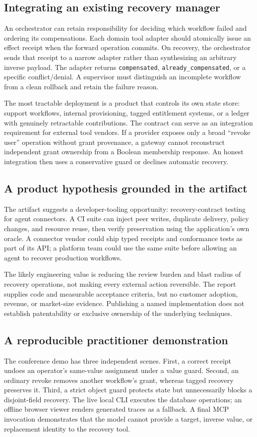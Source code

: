 \documentclass[10pt,twocolumn]{article}
\begin{document}
\subsection{Integrating an existing recovery manager}
An orchestrator can retain responsibility for deciding which workflow failed and ordering its compensations. Each domain tool adapter should atomically issue an effect receipt when the forward operation commits. On recovery, the orchestrator sends that receipt to a narrow adapter rather than synthesizing an arbitrary inverse payload. The adapter returns \texttt{compensated}, \texttt{already\_compensated}, or a specific conflict/denial. A supervisor must distinguish an incomplete workflow from a clean rollback and retain the failure reason.

The most tractable deployment is a product that controls its own state store: support workflows, internal provisioning, tagged entitlement systems, or a ledger with genuinely retractable contributions. The contract can serve as an integration requirement for external tool vendors. If a provider exposes only a broad ``revoke user'' operation without grant provenance, a gateway cannot reconstruct independent grant ownership from a Boolean membership response. An honest integration then uses a conservative guard or declines automatic recovery.

\subsection{A product hypothesis grounded in the artifact}
The artifact suggests a developer-tooling opportunity: recovery-contract testing for agent connectors. A CI suite can inject peer writes, duplicate delivery, policy changes, and resource reuse, then verify preservation using the application's own oracle. A connector vendor could ship typed receipts and conformance tests as part of its API; a platform team could use the same suite before allowing an agent to recover production workflows.

The likely engineering value is reducing the review burden and blast radius of recovery operations, not making every external action reversible. The report supplies code and measurable acceptance criteria, but no customer adoption, revenue, or market-size evidence. Publishing a named implementation does not establish patentability or exclusive ownership of the underlying techniques.

\subsection{A reproducible practitioner demonstration}
The conference demo has three independent scenes. First, a correct receipt undoes an operator's same-value assignment under a value guard. Second, an ordinary revoke removes another workflow's grant, whereas tagged recovery preserves it. Third, a strict object guard protects state but unnecessarily blocks a disjoint-field recovery. The live local CLI executes the database operations; an offline browser viewer renders generated traces as a fallback. A final MCP invocation demonstrates that the model cannot provide a target, inverse value, or replacement identity to the recovery tool.
\end{document}
